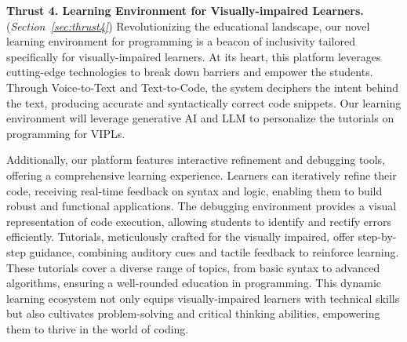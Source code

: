 \vspace{3pt}
\noindent \textbf{Thrust 4. Learning Environment for Visually-impaired Learners.} ({\em Section~\ref{sec:thrust4}})
Revolutionizing the educational landscape, our novel learning
environment for programming is a beacon of inclusivity tailored
specifically for visually-impaired learners. At its heart, this
platform leverages cutting-edge technologies to break down barriers
and empower the students.
Through Voice-to-Text and Text-to-Code, the system deciphers the
intent behind the text, producing accurate and syntactically correct
code snippets. Our learning environment will leverage generative AI
and LLM to personalize the tutorials on programming for VIPLs.

Additionally, our platform features interactive refinement and
debugging tools, offering a comprehensive learning
experience. Learners can iteratively refine their code, receiving
real-time feedback on syntax and logic, enabling them to build robust
and functional applications. The debugging environment provides a
visual representation of code execution, allowing students to identify
and rectify errors efficiently. Tutorials, meticulously crafted for
the visually impaired, offer step-by-step guidance, combining auditory
cues and tactile feedback to reinforce learning. These tutorials cover
a diverse range of topics, from basic syntax to advanced algorithms,
ensuring a well-rounded education in programming. This dynamic
learning ecosystem not only equips visually-impaired learners with
technical skills but also cultivates problem-solving and critical
thinking abilities, empowering them to thrive in the world of
coding.

